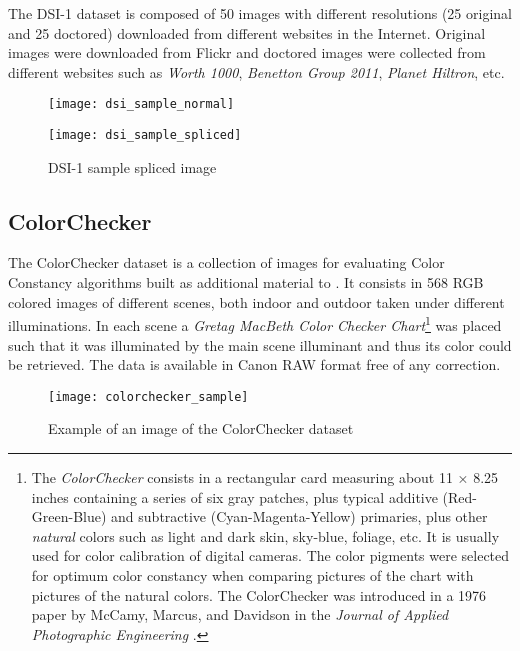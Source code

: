 The DSI-1 dataset is composed of 50 images with different resolutions (25 original and 25 doctored) downloaded from different websites in the Internet. Original images were downloaded from Flickr and doctored images were collected from different websites such as \emph{Worth 1000}, \emph{Benetton Group 2011}, \emph{Planet Hiltron}, etc.

\begin{figure}[!htb]
  \texttt{[image: dsi\_sample\_normal]}
  \caption{DSI-1 sample original image}\label{fig:dsioriginalimage}
\endminipage\hfill
{}
  \texttt{[image: dsi\_sample\_spliced]}
  \caption{DSI-1 sample spliced image}\label{fig:dsisplicedimage}
\endminipage
\end{figure}

\subsection{ColorChecker}

The ColorChecker dataset is a collection of images for evaluating Color Constancy algorithms built as additional material to \cite{gehler2008bayesian}. It consists in 568 RGB colored images of different scenes, both indoor and outdoor taken under different illuminations. In each scene a \emph{Gretag MacBeth Color Checker Chart}\footnote{The \emph{ColorChecker} consists in a rectangular card measuring about 11 × 8.25 inches containing a series of six gray patches, plus typical additive (Red-Green-Blue) and subtractive (Cyan-Magenta-Yellow) primaries, plus other \emph{natural} colors such as light and dark skin, sky-blue, foliage, etc. It is usually used for color calibration of digital cameras. The color pigments were selected for optimum color constancy when comparing pictures of the chart with pictures of the natural colors. The ColorChecker was introduced in a 1976 paper by McCamy, Marcus, and Davidson in the \emph{Journal of Applied Photographic Engineering} \cite{mccamy1976color}.}  was placed such that it was illuminated by the main scene illuminant and thus its color could be retrieved. The data is available in Canon RAW format free of any correction.

\begin{figure}[h!]
  \centering
    \texttt{[image: colorchecker\_sample]}
    \caption{Example of an image of the ColorChecker dataset}
    \label{fig:colorcheckersample}
\end{figure}


